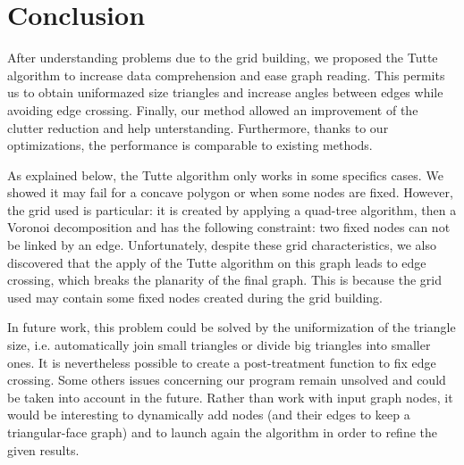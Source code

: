 \chapter*{Conclusion}

After understanding problems due to the grid building, we proposed the Tutte algorithm to increase data comprehension and ease graph reading. This permits us to obtain uniformazed size triangles and increase angles between edges while avoiding edge crossing. 
Finally, our method allowed an improvement of the clutter reduction and help unterstanding. Furthermore, thanks to our optimizations, the performance is comparable to existing methods.


As explained below, the Tutte algorithm only works in some specifics cases. We showed it may fail for a concave polygon or when some nodes are fixed. However, the grid used is particular: it is created by applying a quad-tree algorithm, then a Voronoi decomposition and has the following constraint: two fixed nodes can not be linked by an edge.
Unfortunately, despite these grid characteristics, we also discovered that the apply of the Tutte algorithm on this graph leads to edge crossing, which breaks the planarity of the final graph. This is because the grid used may contain some fixed nodes created during the grid building.


In future work, this problem could be solved by the uniformization of the triangle size, i.e. automatically join small triangles or divide big triangles into smaller ones. It is nevertheless possible to create a post-treatment function to fix edge crossing. 
Some others issues concerning our program remain unsolved and could be taken into account in the future. Rather than work with input graph nodes, it would be interesting to dynamically add nodes (and their edges to keep a triangular-face graph) and to launch again the algorithm in order to refine the given results.

